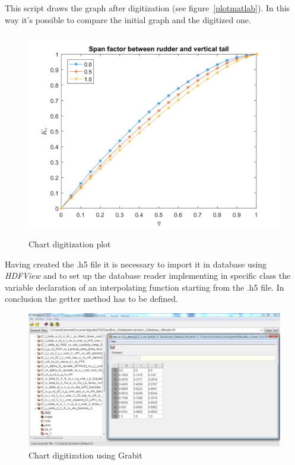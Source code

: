\newpage
This script draws the graph after digitization (see figure~\vref{plotmatlab}). In this way it's possible to compare the initial graph and the digitized one.

\begin{figure}[htbp]
\centering
\includegraphics[height=9cm]{Immagini/Appendice1/plotmatlab}
\caption{Chart digitization plot}
\label{plotmatlab}
\end{figure} 

Having created the .h5 file it is necessary to import it in database using \emph{HDFView} \cite{HDF} and to set up the database reader implementing in specific class the variable declaration of an interpolating function starting from the .h5 file. In conclusion the getter method has to be defined.

\begin{figure}[H]
\centering
\includegraphics[width=\textwidth]{Immagini/Appendice1/HDF} 
\caption{Chart digitization using Grabit}
\label{HDF}
\end{figure} 

